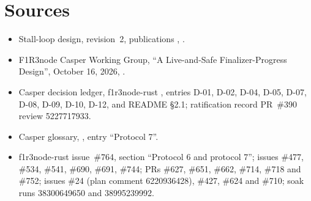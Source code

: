 \documentclass[11pt]{article}
\newcommand{\code}{\path}
\begin{document}
\section{Sources}

\begin{itemize}
\item Stall-loop design, revision~2, publications \code{0b3255fc8}, .
\item F1R3node Casper Working Group, ``A Live-and-Safe Finalizer-Progress Design'', October 16, 2026, .
\item Casper decision ledger, f1r3node-rust , entries D-01, D-02, D-04, D-05, D-07, D-08, D-09, D-10, D-12, and README \S2.1; ratification record PR~\#390 review 5227717933.
\item Casper glossary, , entry ``Protocol 7''.
\item f1r3node-rust issue~\#764, section ``Protocol 6 and protocol 7''; issues \#477, \#534, \#541, \#690, \#691, \#744; PRs \#627, \#651, \#662, \#714, \#718 and \#752; issues \#24 (plan comment 6220936428), \#427, \#624 and \#710; soak runs 38300649650 and 38995239992.
\end{itemize}
\end{document}
